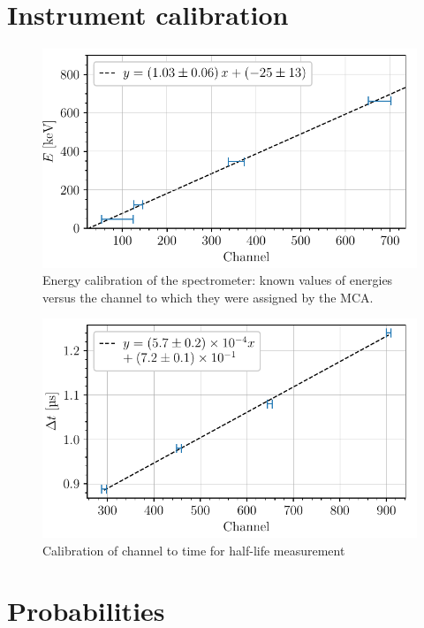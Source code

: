 \section{Instrument calibration}
\label{sec:calibration}
\begin{figure}[htbp]
    \centering
    \includegraphics[scale=1]{figures/calibration_energy.pdf}
    \caption{Energy calibration of the spectrometer: known values of energies 
    versus the channel to which they were assigned by the MCA.}
    \label{fig:calibration_energy}
\end{figure}

\begin{figure}[htbp]
    \centering
    \includegraphics[scale=1]{figures/calibration_time_interval.pdf}    
    \caption{Calibration of channel to time for half-life measurement}
    \label{fig:calibration_halflife}
\end{figure}

\section{Probabilities}
\label{sec:pearson}

